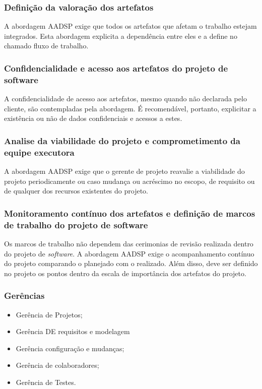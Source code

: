\documentclass{acm_proc_article-sp}
\begin{document}
\subsubsection*{Definição da valoração dos artefatos}
A abordagem AADSP  exige que todos os artefatos que afetam o trabalho estejam integrados. Esta abordagem explicita a dependência entre eles e a define no chamado fluxo de trabalho\cite{aadsp:hibirdo}.

\subsubsection*{Confidencialidade e acesso aos artefatos do projeto de software}
A confidencialidade de acesso aos artefatos, mesmo quando não declarada pelo cliente, são contempladas pela abordagem. É recomendável, portanto, explicitar a existência ou não de dados confidenciais e acessos a estes\cite{aadsp:hibirdo}.

\subsubsection*{Analise da viabilidade do projeto e comprometimento da equipe executora}
A abordagem AADSP exige que o gerente de projeto reavalie a viabilidade do projeto periodicamente ou caso mudança ou acréscimo no escopo, de requisito ou de qualquer dos recursos existentes do projeto\cite{aadsp:hibirdo}.

\subsubsection*{Monitoramento contínuo dos artefatos e definição de marcos de trabalho do projeto de software}
Os marcos de trabalho não dependem das cerimonias de revisão realizada dentro do projeto de \textit{software}.  A abordagem AADSP exige o acompanhamento contínuo do projeto comparando o planejado com o realizado. Além disso, deve ser definido no projeto os pontos dentro da escala de importância dos artefatos do projeto. 

\subsubsection*{Gerências}

\begin{itemize}
\item Gerência de Projetos;
\item Gerência DE requisitos e modelagem
\item Gerência configuração e mudanças;
\item Gerência de colaboradores;
\item Gerência de Testes.
\end{itemize}
\end{document}
